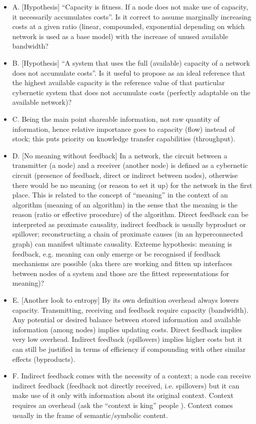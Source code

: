 \documentclass[14pt,a4paper]{extarticle}
\begin{document}
\begin{itemize}
\item A. [Hypothesis] “Capacity is fitness. If a node does not make use of capacity, it necessarily accumulates costs”. Is it correct to assume marginally increasing costs at a given ratio (linear, compounded, exponential depending on which network is used as a base model) with the increase of unused available bandwidth?
\item B. [Hypothesis] “A system that uses the full (available) capacity of a network does not accumulate costs”. Is it useful to propose as an ideal reference that the highest available capacity is the reference value of that particular cybernetic system that does not accumulate costs (perfectly adaptable on the available network)?
\item C. Being the main point shareable information, not raw quantity of information, hence relative importance goes to capacity (flow) instead of stock; this puts priority on knowledge transfer capabilities (throughput).
\item D. [No meaning without feedback] In a network, the circuit between a transmitter (a node) and a receiver (another node) is defined as a cybernetic circuit (presence of feedback, direct or indirect between nodes), otherwise there would be no meaning (or reason to set it up) for the network in the first place. This is related to the concept of “meaning” in the context of an algorithm (meaning of an algorithm) in the sense that the meaning is the reason (ratio or effective procedure) of the algorithm. Direct feedback can be interpreted as proximate causality, indirect feedback is usually byproduct or spillover; reconstructing a chain of proximate causes (in an hyperconnected graph) can manifest ultimate causality. Extreme hypothesis: meaning is feedback, e.g. meaning can only emerge or be recognised if feedback mechanisms are possible (aka there are working and fitten up interfaces between nodes of a system and those are the fittest representations for meaning)? 
\item E. [Another look to entropy] By its own definition overhead always lowers capacity. Transmitting, receiving and feedback require capacity (bandwidth). Any potential or desired balance between stored information and available information (among nodes) implies updating costs. Direct feedback implies very low overhead. Indirect feedback (spillovers) implies higher costs but it can still be justified in terms of efficiency if compounding with other similar effects (byproducts).
\item F. Indirect feedback comes with the necessity of a context; a node can receive indirect feedback (feedback not directly received, i.e. spillovers) but it can make use of it only with information about its original context. Context requires an overhead (ask the “context is king” people \cite{doi:10.1057}). Context comes usually in the frame of semantic/symbolic content.
\end{itemize}
\end{document}
